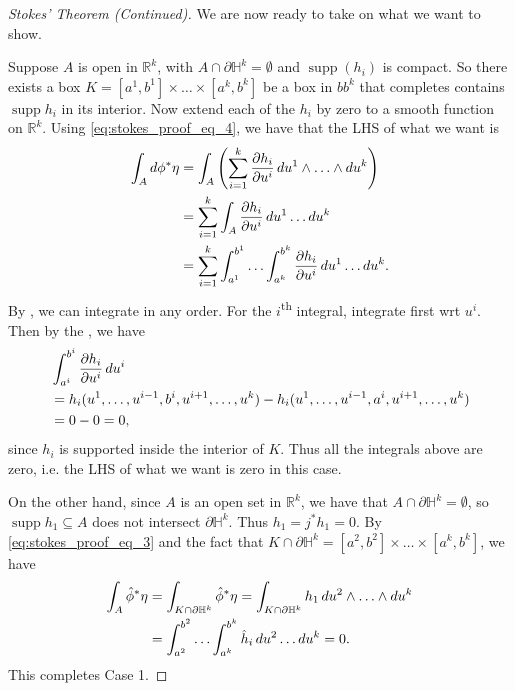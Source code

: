 \documentclass[notoc,notitlepage]{tufte-book}
\DeclareMathOperator{\supp}{supp}
\begin{document}
\begin{proof}[Stokes' Theorem (Continued)]
  We are now ready to take on what we want to show.

  \noindent
   Suppose $A$ is open in $\mathbb{R}^k$, with $A \cap \partial
  \mathbb{H}^k = \emptyset$ and $\supp(h_i)$ is compact. So there exists a box
  $K = [a^1, b^1] \times \hdots \times [a^k, b^k]$ be a box in $bb^k$ that
  completes contains $\supp h_i$ in its interior. Now extend each of the $h_i$ 
  by zero to a smooth function on $\mathbb{R}^k$. Using
  \cref{eq:stokes_proof_eq_4}, we have that the LHS of what we want is
  \begin{align*}
    \int_{A} \mathop{}\!d{\phi^* \eta}
    &= \int_{A} \left( \sum_{i=1}^{k} \frac{\partial h_i}{\partial u^i}
    \mathop{}\!d{u^1} \land \hdots \land \mathop{}\!d{u^k} \right) \\
    &= \sum_{i=1}^{k} \int_{A} \frac{\partial h_i}{\partial u^i} \mathop{}\!d{u^1}
    \hdots \mathop{}\!d{u^k} \\
    &= \sum_{i=1}^{k} \int_{a^1}^{b^1} \hdots \int_{a^k}^{b^k} \frac{\partial
    h_i}{\partial u^i} \mathop{}\!d{u^1} \hdots \mathop{}\!d{u^k}.
  \end{align*}
  By , we can integrate in any order. For the
  $i$\textsuperscript{th} integral, integrate first wrt $u^i$. Then by the
  , we have
  \begin{align*}
    &\int_{a^i}^{b^i} \frac{\partial h_i}{\partial u^i} \mathop{}\!d{u^i} \\
    &= h_i(u^1, \ldots, u^{i-1}, b^i, u^{i+1}, \ldots, u^k) - h_i(u^1, \ldots,
    u^{i-1}, a^i, u^{i+1}, \ldots, u^k) \\
    &= 0 - 0 = 0,
  \end{align*}
  since $h_i$ is supported inside the interior of $K$. Thus all the integrals
  above are zero, i.e. the LHS of what we want is zero in this case.

  On the other hand, since $A$ is an open set in $\mathbb{R}^k$, we have that $A
  \cap \partial \mathbb{H}^k = \emptyset$, so $\supp h_1 \subseteq A$ does not
  intersect $\partial \mathbb{H}^k$. Thus $h_1 = j^* h_1 = 0$. By
  \cref{eq:stokes_proof_eq_3} and the fact that $K \cap \partial \mathbb{H}^k =
  [a^2, b^2] \times \hdots \times [a^k, b^k]$, we have
  \begin{align*}
    \int_{A} \hat{\phi}^* \eta
    &= \int_{K \cap \partial \mathbb{H}^k} \hat{\phi}^* \eta = \int_{K \cap
    \partial \mathbb{H}^k} h_1 \mathop{}\!d{u^2} \land \hdots \land \mathop{}\!d{u^k} \\
    &= \int_{a^2}^{b^2} \hdots \int_{a^k}^{b^k} \hat{h}_i \mathop{}\!d{u^2} \hdots
    \mathop{}\!d{u^k} = 0.
  \end{align*}
  This completes Case 1.


\end{proof}
\end{document}
